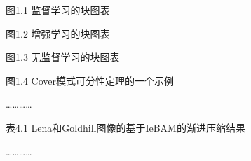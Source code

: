 \begingroup\linespread{1}\fontsize{10.5bp}{18.72bp}\selectfont
\noindent 图1.1 监督学习的块图表\par
\noindent 图1.2 增强学习的块图表\par
\noindent 图1.3 无监督学习的块图表\par
\noindent 图1.4 Cover模式可分性定理的一个示例\par
\noindent …………

\vspace{18.72bp}
\noindent 表4.1 Lena和Goldhill图像的基于IeBAM的渐进压缩结果\par
\noindent …………

\par\endgroup
